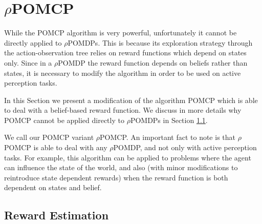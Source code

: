 \section{$\rho$POMCP}

While the POMCP algorithm is very powerful, unfortunately it cannot be directly applied to
$\rho$POMDPs. This is because its exploration strategy through the action-observation tree relies
on reward functions which depend on states only. Since in a $\rho$POMDP the reward function depends
on beliefs rather than states, it is necessary to modify the algorithm in order to be used on active
perception tasks.

In this Section we present a modification of the algorithm POMCP which is able to deal with a
belief-based reward function. We discuss in more details why POMCP cannot be applied directly to
$\rho$POMDPs in Section \ref{ref:rewestimation}.

We call our POMCP variant $\rho$POMCP. An important fact to note is that $\rho$POMCP is able to deal
with any $\rho$POMDP, and not only with active perception tasks. For example, this algorithm can be
applied to problems where the agent can influence the state of the world, and also (with minor
modifications to reintroduce state dependent rewards) when the reward function is both dependent on
states and belief.

%
%
%

\subsection{Reward Estimation}\label{ref:rewestimation}

